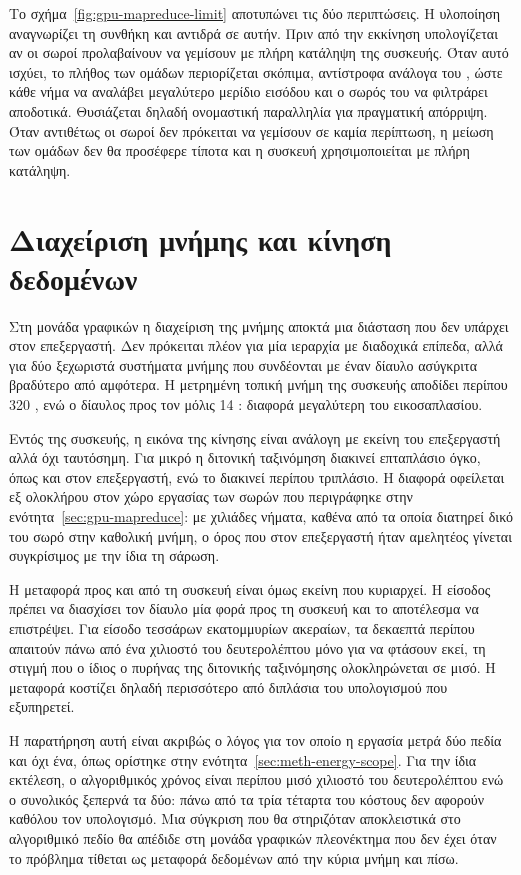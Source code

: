 Το σχήμα~\ref{fig:gpu-mapreduce-limit} αποτυπώνει τις δύο περιπτώσεις.
Η υλοποίηση αναγνωρίζει τη συνθήκη και αντιδρά σε αυτήν. Πριν από την εκκίνηση
υπολογίζεται αν οι σωροί προλαβαίνουν να γεμίσουν με πλήρη κατάληψη της
συσκευής. Όταν αυτό ισχύει, το πλήθος των ομάδων περιορίζεται σκόπιμα, αντίστροφα
ανάλογα του , ώστε κάθε νήμα να αναλάβει μεγαλύτερο μερίδιο εισόδου και ο
σωρός του να φιλτράρει αποδοτικά. Θυσιάζεται δηλαδή ονομαστική παραλληλία για
πραγματική απόρριψη. Όταν αντιθέτως οι σωροί δεν πρόκειται να γεμίσουν σε καμία
περίπτωση, η μείωση των ομάδων δεν θα προσέφερε τίποτα και η συσκευή
χρησιμοποιείται με πλήρη κατάληψη.



\section{Διαχείριση μνήμης και κίνηση δεδομένων}
\label{sec:gpu-memory}

Στη μονάδα γραφικών η διαχείριση της μνήμης αποκτά μια διάσταση που δεν υπάρχει
στον επεξεργαστή. Δεν πρόκειται πλέον για μία ιεραρχία με διαδοχικά επίπεδα,
αλλά για δύο ξεχωριστά συστήματα μνήμης που συνδέονται με έναν δίαυλο
ασύγκριτα βραδύτερο από αμφότερα. Η μετρημένη τοπική μνήμη της συσκευής
αποδίδει περίπου 320 , ενώ ο δίαυλος προς τον  μόλις 14
: διαφορά μεγαλύτερη του εικοσαπλασίου.

Εντός της συσκευής, η εικόνα της κίνησης είναι ανάλογη με εκείνη του
επεξεργαστή αλλά όχι ταυτόσημη. Για μικρό  η διτονική ταξινόμηση διακινεί
επταπλάσιο όγκο, όπως και στον επεξεργαστή, ενώ το  διακινεί
περίπου τριπλάσιο. Η διαφορά οφείλεται εξ ολοκλήρου στον χώρο
εργασίας των σωρών που περιγράφηκε στην ενότητα~\ref{sec:gpu-mapreduce}: με
χιλιάδες νήματα, καθένα από τα οποία διατηρεί δικό του σωρό στην καθολική μνήμη,
ο όρος που στον επεξεργαστή ήταν αμελητέος γίνεται συγκρίσιμος με την ίδια τη
σάρωση.

Η μεταφορά προς και από τη συσκευή είναι όμως εκείνη που κυριαρχεί. Η είσοδος
πρέπει να διασχίσει τον δίαυλο μία φορά προς τη συσκευή και το αποτέλεσμα να
επιστρέψει. Για είσοδο τεσσάρων εκατομμυρίων ακεραίων, τα δεκαεπτά περίπου
 απαιτούν πάνω από ένα χιλιοστό του δευτερολέπτου μόνο για να φτάσουν
εκεί, τη στιγμή που ο ίδιος ο πυρήνας της διτονικής ταξινόμησης ολοκληρώνεται σε
μισό. Η μεταφορά κοστίζει δηλαδή περισσότερο από διπλάσια του υπολογισμού που
εξυπηρετεί.

Η παρατήρηση αυτή είναι ακριβώς ο λόγος για τον οποίο η εργασία μετρά δύο πεδία
και όχι ένα, όπως ορίστηκε στην ενότητα~\ref{sec:meth-energy-scope}. Για την ίδια
εκτέλεση, ο αλγοριθμικός χρόνος είναι περίπου μισό χιλιοστό του δευτερολέπτου
ενώ ο συνολικός ξεπερνά τα δύο: πάνω από τα τρία τέταρτα του κόστους δεν
αφορούν καθόλου τον υπολογισμό. Μια σύγκριση που θα στηριζόταν αποκλειστικά στο
αλγοριθμικό πεδίο θα απέδιδε στη μονάδα γραφικών πλεονέκτημα που δεν έχει όταν
το πρόβλημα τίθεται ως μεταφορά δεδομένων από την κύρια μνήμη και πίσω.

